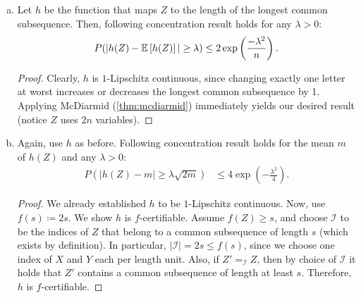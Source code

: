 \begin{aufgabe}
\begin{enumerate}[(a)]
\begin{proof}
                  Since our problem yields a lower bound of the expected length, we have shown $\frac{n}{k} \leq l$.
                  Strict inequality follows by repeating the process for another starting position in $X$ and taking the maximum of the respective output length.
                  The sole existence of instances such that this increases our lower bound suffices to disprove equality, and we do not need to do any exact math with highly correlated processes.
              \end{proof}
        \item
              Let $h$ be the function that maps $Z$ to the length of the longest common subsequence.
              Then, following concentration result holds for any $\lambda > 0$:
              \begin{align*}
                  P(|h(Z) - \mathbb{E}\left[h(Z)\right]| \geq \lambda) \leq 2\exp \left(\frac{-\lambda^2}{n}\right).
              \end{align*}
              \begin{proof}
                  Clearly, $h$ is $1$-Lipschitz continuous,
                  since changing exactly one letter at worst increases or decreases the longest common subsequence by 1.
                  Applying McDiarmid (\autoref{thm:mcdiarmid}) immediately yields our desired result (notice $Z$ uses $2n$ variables).
              \end{proof}
        \item Again, use $h$ as before.
              Following concentration result holds for the mean $m$ of $h(Z)$ and any $\lambda > 0$:
              \begin{align*}
                  P(|h(Z) - m | \geq \lambda\sqrt{2m}) & \leq 4\exp\left(-\frac{\lambda^2}{4}\right).
              \end{align*}
              \begin{proof}
                  We already established $h$ to be $1$-Lipschitz continuous.
                  Now, use $f(s) \coloneqq 2s$. We show $h$ is $f$-certifiable.
                  Assume $f(Z) \geq s$, and choose $\mathcal I$ to be the indices of $Z$ that belong to a common subsequence of length $s$ (which exists by definition).
                  In particular, $|\mathcal I| = 2s \leq f(s)$, since we choose one index of $X$ and $Y$ each per length unit.
                  Also, if $Z' =_{\mathcal I} Z$, then by choice of $\mathcal I$ it holds that $Z'$ contains a common subsequence of length at least $s$. Therefore, $h$ is $f$-certifiable.


\end{proof}
\end{enumerate}
\end{aufgabe}
